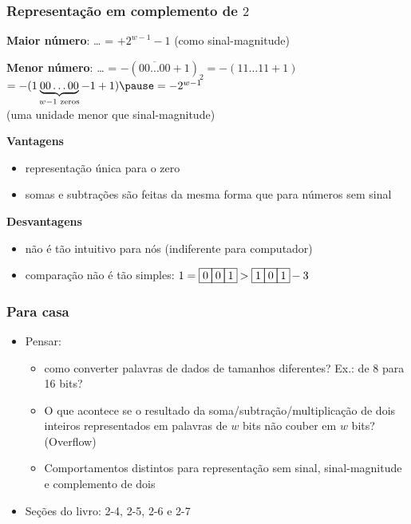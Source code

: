 \documentclass{beamer}
\newcommand{\WD}[1]{\fbox{#1}\hspace{-0.5pt}}
\begin{document}
\begin{frame}[fragile]
\frametitle{Representação em complemento de $2$}

\textbf{Maior número}: \WD{0}\WD{1}\WD{1}\ldots\WD{1}\WD{1} = $+2^{w-1} - 1$ (como sinal-magnitude)\\[12pt]

\pause

\textbf{Menor número}: \WD{1}\WD{0}\WD{0}\ldots\WD{0}\WD{0} = $-(\overline{00\ldots00} + 1)_2 = - (11\ldots11 + 1)$\\[6pt]
\pause
\hfill$= - (1\underbrace{00\ldots00}_{w-1\text{ zeros}} - 1 + 1) \pause = -2^{w-1}$\\(uma unidade menor que sinal-magnitude)

\pause

\textbf{Vantagens}

\begin{itemize}
\item representação única para o zero
\item somas e subtrações são feitas da mesma forma que para números sem sinal
\end{itemize}

\textbf{Desvantagens}

\begin{itemize}
\item não é tão intuitivo para nós (indiferente para computador)
\item comparação não é tão simples: $1 = \WD{0}\WD{0}\WD{1} > \WD{1}\WD{0}\WD{1} -3$
\end{itemize}

\end{frame}

\begin{frame}
\frametitle{Para casa}

\begin{itemize}
\item Pensar:
\begin{itemize}
\item como converter palavras de dados de tamanhos diferentes? Ex.: de 8 para 16 bits?
\pause
\item O que acontece se o resultado da soma/subtração/multiplicação de dois inteiros representados em palavras de $w$ bits não couber em $w$ bits? (Overflow)
\pause
\item Comportamentos distintos para representação sem sinal, sinal-magnitude e complemento de dois
\pause
\end{itemize}
\item Seções do livro: 2-4, 2-5, 2-6 e 2-7
\end{itemize}

\end{frame}
\end{document}
